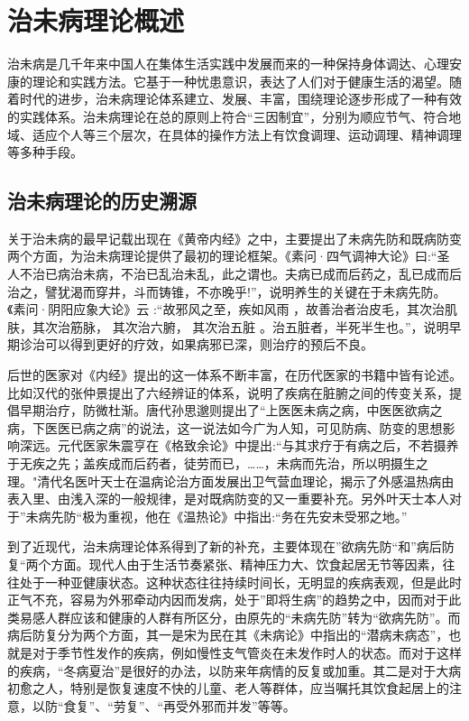 \section{治未病理论概述}
治未病是几千年来中国人在集体生活实践中发展而来的一种保持身体调达、心理安康的理论和实践方法。它基于一种忧患意识，表达了人们对于健康生活的渴望。随着时代的进步，治未病理论体系建立、发展、丰富，围绕理论逐步形成了一种有效的实践体系。治未病理论在总的原则上符合“三因制宜”，分别为顺应节气、符合地域、适应个人等三个层次，在具体的操作方法上有饮食调理、运动调理、精神调理等多种手段。

\subsection{治未病理论的历史溯源}
关于治未病的最早记载出现在《黄帝内经》之中，主要提出了未病先防和既病防变两个方面，为治未病理论提供了最初的理论框架。《素问·四气调神大论》曰:“圣人不治已病治未病，不治已乱治未乱，此之谓也。夫病已成而后药之，乱已成而后治之，譬犹渴而穿井，斗而铸锥，不亦晚乎!”\cite{南京中医学院医经教研组1981黄帝内经素问译释}，说明养生的关键在于未病先防。《素问·阴阳应象大论》云 :“故邪风之至，疾如风雨 ，故善治者治皮毛，其次治肌肤，其次治筋脉， 其次治六腑， 其次治五脏 。治五脏者，半死半生也。”\cite{南京中医学院医经教研组1981黄帝内经素问译释}，说明早期诊治可以得到更好的疗效，如果病邪已深，则治疗的预后不良。

后世的医家对《内经》提出的这一体系不断丰富，在历代医家的书籍中皆有论述。比如汉代的张仲景提出了六经辨证的体系，说明了疾病在脏腑之间的传变关系，提倡早期治疗，防微杜渐。唐代孙思邈则提出了“上医医未病之病，中医医欲病之病，下医医已病之病”\cite{李俊德2008中医必读百部名著}的说法，这一说法如今广为人知，可见防病、防变的思想影响深远。元代医家朱震亨在《格致余论》中提出:“与其求疗于有病之后，不若摄养于无疾之先；盖疾成而后药者，徒劳而已，……，未病而先治，所以明摄生之理。"\cite{朱震亨2008格致余论}清代名医叶天士在温病论治方面发展出卫气营血理论，揭示了外感温热病由表入里、由浅入深的一般规律，是对既病防变的又一重要补充。另外叶天士本人对于”未病先防“极为重视，他在《温热论》中指出:“务在先安未受邪之地。”\cite{叶桂2007温热论}

到了近现代，治未病理论体系得到了新的补充，主要体现在”欲病先防“和”病后防复“两个方面。现代人由于生活节奏紧张、精神压力大、饮食起居无节等因素，往往处于一种亚健康状态。这种状态往往持续时间长，无明显的疾病表观，但是此时正气不充，容易为外邪牵动内因而发病，处于”即将生病”的趋势之中，因而对于此类易感人群应该和健康的人群有所区分，由原先的“未病先防”转为“欲病先防”。而病后防复分为两个方面，其一是宋为民在其《未病论》\cite{宋为民1992未病论}中指出的“潜病未病态”，也就是对于季节性发作的疾病，例如慢性支气管炎在未发作时人的状态。而对于这样的疾病，“冬病夏治”是很好的办法，以防来年病情的反复或加重。其二是对于大病初愈之人，特别是恢复速度不快的儿童、老人等群体，应当嘱托其饮食起居上的注意，以防“食复”、“劳复”、“再受外邪而并发”等等。

